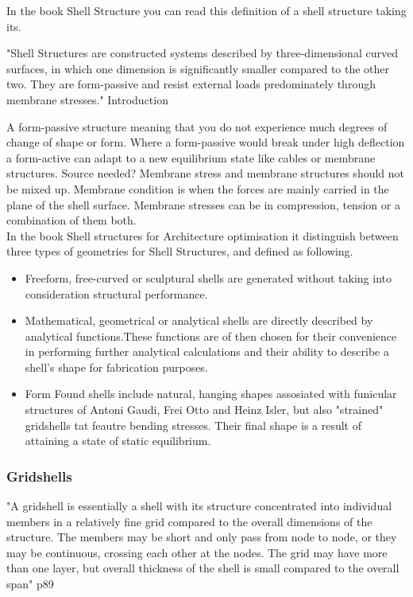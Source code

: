In the book Shell Structure you can read this definition of a shell structure taking its.

"Shell Structures are constructed systems described by three-dimensional curved surfaces, in which one dimension is significantly smaller compared to the other two. They are form-passive and resist external loads predominately through membrane stresses." Introduction 

A form-passive structure meaning that you do not experience much degrees of change of shape or form. Where a form-passive would break under high deflection a form-active can adapt to a new equilibrium state like cables or membrane structures. Source needed? 
Membrane stress and membrane structures should not be mixed up. Membrane condition is when the forces are mainly carried in the plane of the shell surface. Membrane stresses can be in compression, tension or a combination of them both. \\



In the book Shell structures for Architecture optimisation it distinguish between three types of geometries for Shell Structures, and defined as following.




\begin{itemize}
\item Freeform, free-curved or sculptural shells are generated without taking into consideration structural performance.  
\item Mathematical, geometrical or analytical shells are directly described by analytical functions.These functions are of then chosen for their convenience in performing further analytical calculations and their ability to describe a shell's shape for fabrication purposes.
\item Form Found shells include natural, hanging shapes assosiated with funicular structures of Antoni Gaudi, Frei Otto and Heinz Isler, but also "strained" gridshells tat feautre bending stresses. Their final shape is a result of attaining a state of static equilibrium.
\end{itemize}



\subsubsection{Gridshells}


"A gridshell is essentially a  shell with its structure concentrated into individual members in a relatively fine grid compared to the overall dimensions of the structure. The members may be short and only pass from node to node, or they may be continuous, crossing each other at the nodes. The grid may have more than one layer, but overall thickness of the shell is small compared to the overall span" p89

